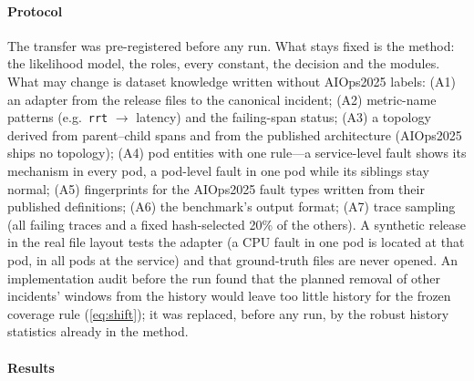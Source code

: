 \paragraph{Protocol}
The transfer was pre-registered before any run. What stays fixed is the method: the likelihood model, the roles, every constant, the
decision and the modules. What may change is dataset knowledge written without AIOps2025 labels: (A1) an adapter from the release
files to the canonical incident; (A2) metric-name patterns (e.g.\ \texttt{rrt} $\rightarrow$ latency) and the failing-span status;
(A3) a topology derived from parent--child spans and from the published architecture (AIOps2025 ships no topology); (A4) pod
entities with one rule---a service-level fault shows its mechanism in every pod, a pod-level fault in one pod while its siblings
stay normal; (A5) fingerprints for the AIOps2025 fault types written from their published definitions; (A6) the benchmark's output
format; (A7) trace sampling (all failing traces and a fixed hash-selected 20\% of the others). A synthetic release in the real file
layout tests the adapter (a CPU fault in one pod is located at that pod, in all pods at the service) and that ground-truth files are
never opened. An implementation audit before the run found that the planned removal of other incidents' windows from the history
would leave too little history for the frozen coverage rule (\cref{eq:shift}); it was replaced, before any run, by the robust
history statistics already in the method.

\paragraph{Results}
